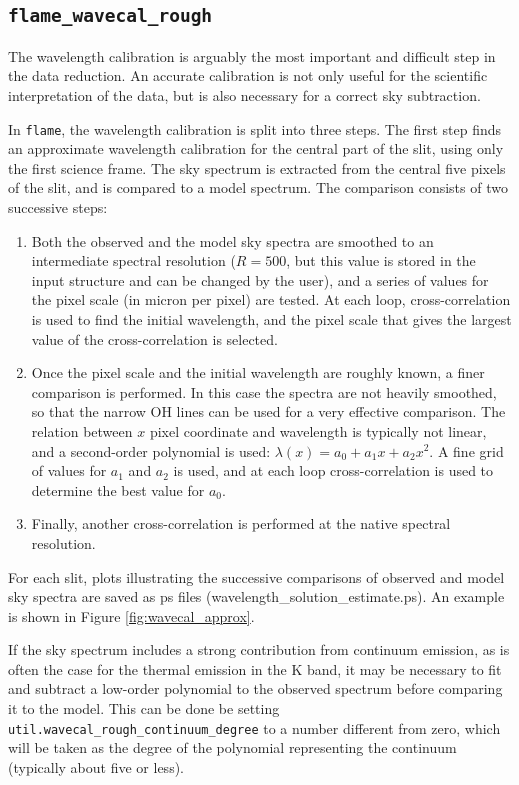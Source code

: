 \documentclass[a4paper, notitlepage]{article}
\newcommand{\flame}{\texttt{flame}}
\begin{document}
\subsection{\texttt{flame\_wavecal\_rough}}

The wavelength calibration is arguably the most important and difficult step in the data reduction. An accurate calibration is not only useful for the scientific interpretation of the data, but is also necessary for a correct sky subtraction.

In \flame, the wavelength calibration is split into three steps. The first step finds an approximate wavelength calibration for the central part of the slit, using only the first science frame. The sky spectrum is extracted from the central five pixels of the slit, and is compared to a model spectrum. The comparison consists of two successive steps:
\begin{enumerate}
\item Both the observed and the model sky spectra are smoothed to an intermediate spectral resolution ($R=500$, but this value is stored in the input structure and can be changed by the user), and a series of values for the pixel scale (in micron per pixel) are tested. At each loop, cross-correlation is used to find the initial wavelength, and the pixel scale that gives the largest value of the cross-correlation is selected.
\item Once the pixel scale and the initial wavelength are roughly known, a finer comparison is performed. In this case the spectra are not heavily smoothed, so that the narrow OH lines can be used for a very effective comparison. The relation between $x$ pixel coordinate and wavelength is typically not linear, and a second-order polynomial is used: $\lambda(x) = a_0 + a_1 x + a_2 x^2$. A fine grid of values for $a_1$ and $a_2$ is used, and at each loop cross-correlation is used to determine the best value for $a_0$.
\item Finally, another cross-correlation is performed at the native spectral resolution.
\end{enumerate}

For each slit, plots illustrating the successive comparisons of observed and model sky spectra are saved as ps files (wavelength\_solution\_estimate.ps). An example is shown in Figure \ref{fig:wavecal_approx}.

If the sky spectrum includes a strong contribution from continuum emission, as is often the case for the thermal emission in the K band, it may be necessary to fit and subtract a low-order polynomial to the observed spectrum before comparing it to the model. This can be done be setting \texttt{util.wavecal\_rough\_continuum\_degree} to a number different from zero, which will be taken as the degree of the polynomial representing the continuum (typically about five or less).
\end{document}
